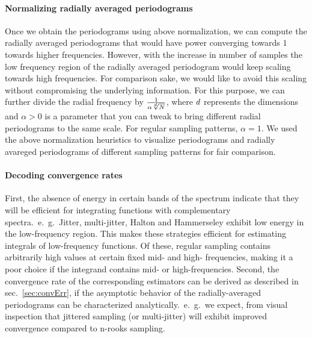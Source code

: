 \documentclass[11pt,fleqn]{book} %
\begin{document}
\paragraph{Normalizing radially averaged periodograms} 
Once we obtain the periodograms using above normalization, we can compute the radially averaged periodograms that would have power converging towards $1$ towards higher frequencies. However, with the increase in number of samples the low frequency region of the radially averaged periodogram would keep scaling towards high frequencies. %
For comparison sake, we would like to avoid this scaling without compromising the underlying information. For this purpose, we can further divide the radial frequency by $\frac{1}{\alpha \sqrt[d]{N}}$, where ${d}$ represents the dimensions and $\alpha > 0$ is a parameter that you can tweak to bring different radial periodograms to the same scale. For regular sampling patterns, $\alpha=1$. We used the above normalization heuristics to visualize periodograms and radially avareged periodograms 
of different sampling patterns for fair comparison.

\paragraph{Decoding convergence rates}
First, the absence of energy in certain bands of the spectrum indicate that they will be efficient for integrating functions with complementary spectra.~e.~g.~Jitter, multi-jitter, Halton and Hammerseley exhibit low energy in the low-frequency region. This makes these strategies efficient for estimating integrals of low-frequency functions. Of these, regular sampling contains arbitrarily high values at certain fixed mid- and high- frequencies, making it a poor choice if the integrand contains mid- or high-frequencies. 
Second, the convergence rate of the corresponding estimators can be derived as described in sec.~\ref{sec:convErr}, if the asymptotic behavior of the radially-averaged periodograms can be characterized analytically.~e.~g.~we expect, from visual inspection that jittered sampling (or multi-jitter) will exhibit improved convergence compared to n-rooks sampling. 
\end{document}
